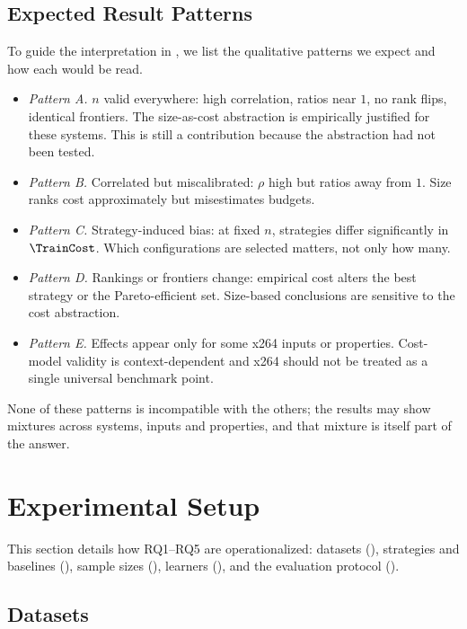 \subsection{Expected Result Patterns}

To guide the interpretation in , we
list the qualitative patterns we expect and how each would be read.
\begin{itemize}
    \item \emph{Pattern A.} $n$ valid everywhere: high correlation, ratios near
    $1$, no rank flips, identical frontiers. The size-as-cost abstraction is
    empirically justified for these systems. This is still a contribution
    because the abstraction had not been tested.
    \item \emph{Pattern B.} Correlated but miscalibrated: $\rho$ high but
    ratios away from $1$. Size ranks cost approximately but misestimates
    budgets.
    \item \emph{Pattern C.} Strategy-induced bias: at fixed $n$, strategies
    differ significantly in $\TrainCost$. Which configurations are selected
    matters, not only how many.
    \item \emph{Pattern D.} Rankings or frontiers change: empirical cost alters
    the best strategy or the Pareto-efficient set. Size-based conclusions are
    sensitive to the cost abstraction.
    \item \emph{Pattern E.} Effects appear only for some x264 inputs or
    properties. Cost-model validity is context-dependent and x264 should not
    be treated as a single universal benchmark point.
\end{itemize}
None of these patterns is incompatible with the others; the results may show
mixtures across systems, inputs and properties, and that mixture is itself
part of the answer.

\section{Experimental Setup}
\label{sec:experiment}

This section details how RQ1--RQ5 are operationalized: datasets
(), strategies and baselines (),
sample sizes (), learners (), and the
evaluation protocol ().

\subsection{Datasets}
\label{subsec:datasets}

